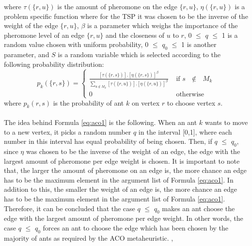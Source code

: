 \documentclass[12pt]{article}
\numberwithin{equation}{subsection}
\numberwithin{table}{subsection}
\numberwithin{algorithm}{subsection}
\numberwithin{figure}{subsection}
\begin{document}
where $\tau(\{r,u\})$ is the amount of pheromone on the edge $\{r,u\}$, $\eta(\{r,u\})$ is a problem specific function where for the TSP it was chosen to be the inverse of the weight of the edge $\{r,u\}$, $\beta$ is a parameter which weighs the importance of the pheromone level of an edge $\{r,u\}$ and the closeness of $u$ to $r$, 0 $\leq$ $q$ $\leq$ 1 is a random value chosen with uniform probability, 0 $\leq$ $q_0$ $\leq$ 1 is another parameter, and $S$ is a random variable which is selected according to the following probability distribution:
\begin{equation}
  \label{eq:aco2}
  p_k(\{r,s\})=\begin{cases}
             \displaystyle {\frac{[\tau(\{r,s\})].[\eta(\{r, s\})]^\beta}{\sum_{u \notin M_k} [\tau(\{r,u\})].[\eta(\{r, u\})]^\beta }} &\text{ if $s$ $\notin$ $M_k$}\\ 
             0 &\text{ 	otherwise}
            \end{cases}
\end{equation}
where $p_k(r,s)$ is the probability of ant $k$ on vertex $r$ to choose vertex $s$. \cite{dorigo_gambardella_1997}\\\\
The idea behind Formula \ref{eq:aco1} is the following. When an ant $k$ wants to move to a new vertex, it picks a random number $q$ in the interval [0,1], where each number in this interval has equal probability of being chosen. Then, if $q$ $\leq$ $q_0$, since $\eta$ was chosen to be the inverse of the weight of an edge, the edge with the largest amount of pheromone per edge weight is chosen. It is important to note that, the larger the amount of pheromone on an edge is, the more chance an edge has to be the maximum element in the argument list of Formula \ref{eq:aco1}. In addition to this, the smaller the weight of an edge is, the more chance an edge has to be the maximum element in the argument list of Formula \ref{eq:aco1}. Therefore, it can be concluded that the case $q$ $\leq$ $q_0$ makes an ant choose the edge with the largest amount of pheromone per edge weight. In other words, the case $q$ $\leq$ $q_0$ forces an ant to choose the edge which has been chosen by the majority of ants as required by the ACO metaheuristic. \cite{dorigo_gambardella_1997}, \cite{dorigo_stutzle_thomas_2004}\\\\
\end{document}
